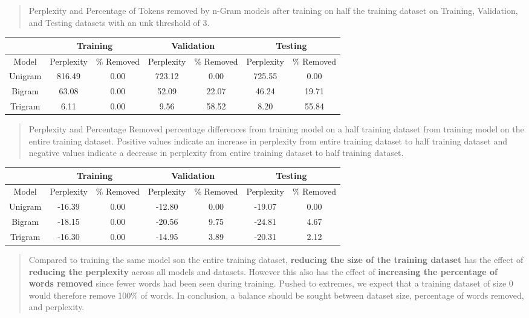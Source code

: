 \begin{quote}
    Perplexity and Percentage of Tokens removed by n-Gram models after training on half the training dataset on Training, Validation, and Testing datasets with an unk threshold of 3.
\end{quote}

\begin{center}
    \begin{tabular}{ |c|c|c|c|c|c|c| } 
	\hline
	 & \multicolumn{2}{c|}{Training} & \multicolumn{2}{c|}{Validation} & \multicolumn{2}{c|}{Testing} \\ 
	\hline
	Model & Perplexity & \% Removed & Perplexity & \% Removed & Perplexity & \% Removed \\
	\hline
	Unigram & 816.49 & 0.00 & 723.12 & 0.00 & 725.55 & 0.00 \\
	\hline
	Bigram & 63.08 & 0.00 & 52.09 & 22.07 & 46.24 & 19.71 \\ 
	\hline
	Trigram & 6.11 & 0.00 & 9.56 & 58.52 & 8.20 & 55.84 \\
	\hline
    \end{tabular}
\end{center}

\begin{quote}
    Perplexity and Percentage Removed percentage differences from training model on a half training dataset from training model on the entire training dataset. Positive values indicate an increase in perplexity from entire training dataset to half training dataset and negative values indicate a decrease in perplexity from entire training dataset to half training dataset.
\end{quote}

\begin{center}
    \begin{tabular}{ |c|c|c|c|c|c|c| } 
	\hline
	 & \multicolumn{2}{c|}{Training} & \multicolumn{2}{c|}{Validation} & \multicolumn{2}{c|}{Testing} \\ 
	\hline
	Model & Perplexity & \% Removed & Perplexity & \% Removed & Perplexity & \% Removed \\
	\hline
	Unigram & -16.39 & 0.00 & -12.80 & 0.00 & -19.07 & 0.00 \\
	\hline
	Bigram & -18.15 & 0.00 & -20.56 & 9.75 & -24.81 & 4.67 \\ 
	\hline
	Trigram & -16.30 & 0.00 & -14.95 & 3.89 & -20.31 & 2.12 \\ 
	\hline
    \end{tabular}
\end{center}


\begin{quote}
    Compared to training the same model son the entire training dataset, {\bf reducing the size of the training dataset} has the effect of {\bf reducing the perplexity} across all models and datasets. However this also has the effect of {\bf increasing the percentage of words removed} since fewer words had been seen during training. Pushed to extremes, we expect that a training dataset of size 0 would therefore remove 100\% of words. In conclusion, a balance should be sought between dataset size, percentage of words removed, and perplexity.
\end{quote}
